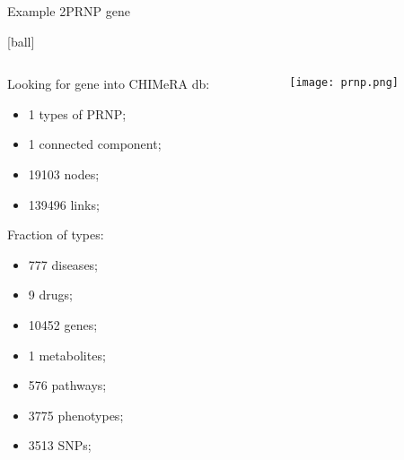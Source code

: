 \documentclass{standalone}
\begin{document}
\begin{frame}{Example 2}{PRNP gene}

  [ball]

  \begin{columns}
    \begin{column}{0.4\textwidth}
      Looking for  gene into CHIMeRA db:

      \begin{itemize}
        \setlength\itemsep{0.5em}
        \item 1 types of PRNP;
        \item 1 connected component;
        \item 19103 nodes;
        \item 139496 links;
      \end{itemize}

      Fraction of types:

      \begin{itemize}

        \item 777 diseases;
        \item 9 drugs;
        \item 10452 genes;
        \item 1 metabolites;
        \item 576 pathways;
        \item 3775 phenotypes;
        \item 3513 SNPs;

      \end{itemize}
    \end{column}

    \begin{column}{0.5\textwidth}
      \centering\texttt{[image: prnp.png]}
    \end{column}
  \end{columns}

\end{frame}
\end{document}
